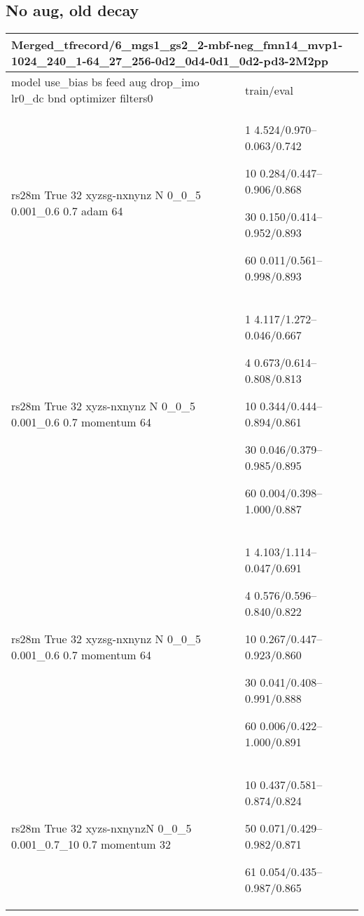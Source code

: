 \documentclass[,table,dvipsnames]{article}
\begin{document}
\subsection{No aug, old decay}
\noindent\begin{tabular}{|p{10cm}|p{5cm}| }	
	\hline
	\multicolumn{2}{|p{15cm}|}{Merged\_tfrecord/6\_mgs1\_gs2\_2-mbf-neg\_fmn14\_mvp1-1024\_240\_1-64\_27\_256-0d2\_0d4-0d1\_0d2-pd3-2M2pp}\\
	\hline
	model use\_bias bs feed aug drop\_imo lr0\_dc bnd optimizer filters0 & train/eval \\
	
	\rowcolor{red!20}
	rs28m True 32 xyzsg-nxnynz N 0\_0\_5 0.001\_0.6 0.7 adam 64&
	1 4.524/0.970--0.063/0.742\par 10 0.284/0.447--0.906/0.868\par 30 0.150/0.414--0.952/0.893\par 60 0.011/0.561--0.998/0.893 \\
	
	\rowcolor{blue!20}
	rs28m True 32 xyzs-nxnynz N 0\_0\_5 0.001\_0.6 0.7 momentum 64&
	1 4.117/1.272--0.046/0.667\par 4 0.673/0.614--0.808/0.813\par 10 0.344/0.444--0.894/0.861\par 30 0.046/0.379--0.985/0.895\par 60 0.004/0.398--1.000/0.887\\
	
	\rowcolor{yellow!20}
	rs28m True 32 xyzsg-nxnynz N 0\_0\_5 0.001\_0.6 0.7 momentum 64&
	1 4.103/1.114--0.047/0.691\par 4 0.576/0.596--0.840/0.822\par 10 0.267/0.447--0.923/0.860\par  30 0.041/0.408--0.991/0.888\par 60 0.006/0.422--1.000/0.891\\
	
	\rowcolor{green!20}
	rs28m True 32 xyzs-nxnynzN 0\_0\_5 0.001\_0.7\_10 0.7 momentum 32&
	10 0.437/0.581--0.874/0.824\par 50 0.071/0.429--0.982/0.871\par 61 0.054/0.435--0.987/0.865\\
	
	 
	
	\hline 
\end{tabular}
\end{document}
